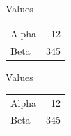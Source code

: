 \documentclass[aspectratio=169]{beamer}
\begin{document}
\begin{frame}[plain,t]
\begin{block}{Values}
\begin{tabular}{lr}
	Alpha & 12 \\
	Beta & 345 \\
\end{tabular}
\end{block}
\end{frame}

\begin{frame}[plain,t]
\begin{block}{Values}
\begin{tabular}{lr}
 Alpha & 12 \\
 Beta & 345 \\
\end{tabular}
\end{block}
\end{frame}
\end{document}
